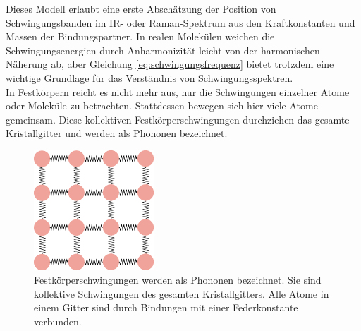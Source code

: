 Dieses Modell erlaubt eine erste Abschätzung der Position von Schwingungsbanden im IR- oder Raman-Spektrum aus den Kraftkonstanten und Massen der Bindungspartner. In realen Molekülen weichen 
die Schwingungsenergien durch Anharmonizität leicht von der harmonischen Näherung ab, aber Gleichung \ref{eq:schwingungsfrequenz} bietet trotzdem eine wichtige Grundlage für das Verständnis von Schwingungsspektren.\\
In Festkörpern reicht es nicht mehr aus, nur die Schwingungen einzelner Atome oder Moleküle zu betrachten. Stattdessen bewegen sich hier viele Atome gemeinsam. 
Diese kollektiven Festkörperschwingungen durchziehen das gesamte Kristallgitter und werden als Phononen bezeichnet.

\begin{figure}[H]
    \centering
    \includegraphics[width=0.4\textwidth]{1_Skript/Inkscape/phonon.png}
    \caption{Festkörperschwingungen werden als Phononen bezeichnet. Sie sind kollektive Schwingungen des gesamten Kristallgitters. Alle Atome in einem Gitter sind durch Bindungen mit einer Federkonstante verbunden.}
    \label{fig:Phonon}
\end{figure}


